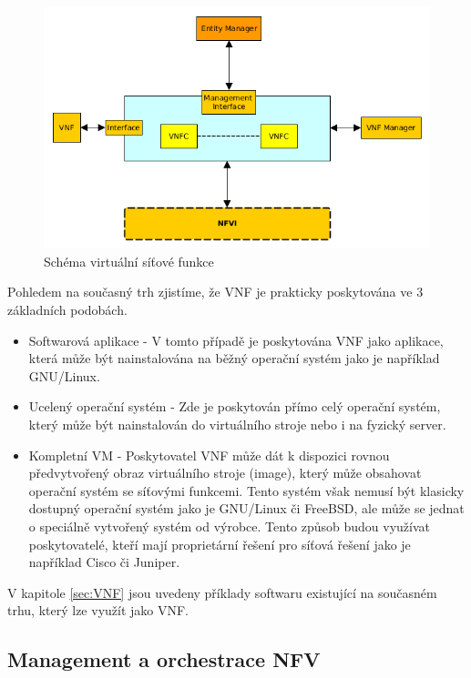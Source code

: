 \begin{figure}[h]
\begin{centering}
\includegraphics[scale=0.67]{images/VNF}
\par\end{centering}
\caption{Schéma virtuální síťové funkce\label{fig:VNF}}
\end{figure}

Pohledem na současný trh zjistíme, že VNF je prakticky poskytována ve 3 základních podobách.

\begin{itemize}
\item Softwarová aplikace - V tomto případě je poskytována VNF jako aplikace, která může být nainstalována na běžný operační systém jako je například GNU/Linux.
\item Ucelený operační systém - Zde je poskytován přímo celý operační systém, který může být nainstalován do virtuálního stroje nebo i na fyzický server.
\item Kompletní VM - Poskytovatel VNF může dát k dispozici rovnou předvytvořený obraz virtuálního stroje (image), který může obsahovat operační systém se síťovými funkcemi. Tento systém však nemusí být klasicky dostupný operační systém jako je GNU/Linux či FreeBSD, ale může se jednat o speciálně vytvořený systém od výrobce. Tento způsob budou využívat poskytovatelé, kteří mají proprietární řešení pro síťová řešení jako je například Cisco či Juniper.
\end{itemize}

V kapitole \ref{sec:VNF} jsou uvedeny příklady softwaru existující na současném trhu, který lze využít jako VNF.

\subsection{Management a orchestrace NFV}

